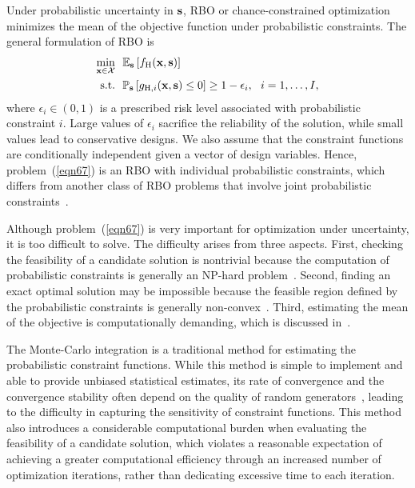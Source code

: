 \documentclass[journal ]{new-aiaa}
\begin{document}
	Under probabilistic uncertainty in ${\bf s}$, RBO or chance-constrained optimization~\citep{Campi2011} minimizes the mean of the objective function under probabilistic constraints.
	The general formulation of RBO is
	\begin{equation}\label{eqn67}
		\begin{aligned}
			\underset{{\bf x} \in \mathcal{X}}{\min} \ \ & \mathbb{E}_{\bf s}\left[f_\text{H}({\bf x},{\bf s})\right]\\
			\textrm{s.t.} \ \ 
			& \mathbb{P}_{\bf s}\left[g_{\text{H},i}({\bf x},{\bf s}) \leq 0\right] \geq 1-\epsilon_i,\ \ i=1,\dots,I, 
		\end{aligned}
	\end{equation}
	where $\epsilon_i \in (0,1)$ is a prescribed risk level associated with probabilistic constraint $i$.
	Large values of $\epsilon_i$ sacrifice the reliability of the solution, while small values lead to conservative designs.
	We also assume that the constraint functions are conditionally independent given a vector of design variables.
	Hence, problem~(\ref{eqn67}) is an RBO with individual probabilistic constraints, which differs from another class of RBO problems that involve joint probabilistic constraints~\citep{Xie2018}.
	
	Although problem~(\ref{eqn67}) is very important for optimization under uncertainty, it is too difficult to solve. 
	The difficulty arises from three aspects.
	First, checking the feasibility of a candidate solution is nontrivial because the computation of probabilistic constraints is generally an NP-hard problem~\citep{Geng2019}.
	Second, finding an exact optimal solution may be impossible because the feasible region defined by the probabilistic constraints is generally non-convex~\citep{Nemirovski2012}.
	Third, estimating the mean of the objective is computationally demanding, which is discussed in~\Cref{Sec631}.
	
	The Monte-Carlo integration is a traditional method for estimating the probabilistic constraint functions.
	While this method is simple to implement and able to provide unbiased statistical estimates, its rate of convergence and the convergence stability often depend on the quality of random generators~\citep{Melchers2018}, leading to the difficulty in capturing the sensitivity of constraint functions.
	This method also introduces a considerable computational burden when evaluating the feasibility of a candidate solution, which violates a reasonable expectation of achieving a greater computational efficiency through an increased number of optimization iterations, rather than dedicating excessive time to each iteration.
	
\end{document}
